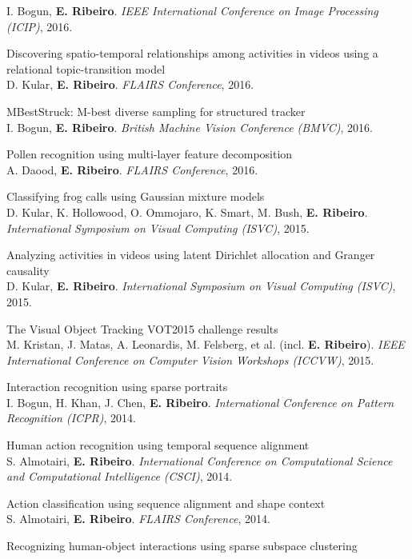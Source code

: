 \documentclass[11pt]{article}
\begin{document}
\begin{cvitems}
  I. Bogun, \textbf{E. Ribeiro}. \textit{IEEE International Conference on Image Processing (ICIP)}, 2016.
  \item Discovering spatio-temporal relationships among activities in videos using a relational topic-transition model\\
  D. Kular, \textbf{E. Ribeiro}. \textit{FLAIRS Conference}, 2016.
  \item MBestStruck: M-best diverse sampling for structured tracker\\
  I. Bogun, \textbf{E. Ribeiro}. \textit{British Machine Vision Conference (BMVC)}, 2016.
  \item Pollen recognition using multi-layer feature decomposition\\
  A. Daood, \textbf{E. Ribeiro}. \textit{FLAIRS Conference}, 2016.
  \item Classifying frog calls using Gaussian mixture models\\
  D. Kular, K. Hollowood, O. Ommojaro, K. Smart, M. Bush, \textbf{E. Ribeiro}. \textit{International Symposium on Visual Computing (ISVC)}, 2015.
  \item Analyzing activities in videos using latent Dirichlet allocation and Granger causality\\
  D. Kular, \textbf{E. Ribeiro}. \textit{International Symposium on Visual Computing (ISVC)}, 2015.
  \item The Visual Object Tracking VOT2015 challenge results\\
  M. Kristan, J. Matas, A. Leonardis, M. Felsberg, et al. (incl. \textbf{E. Ribeiro}). \textit{IEEE International Conference on Computer Vision Workshops (ICCVW)}, 2015.
  \item Interaction recognition using sparse portraits\\
  I. Bogun, H. Khan, J. Chen, \textbf{E. Ribeiro}. \textit{International Conference on Pattern Recognition (ICPR)}, 2014.
  \item Human action recognition using temporal sequence alignment\\
  S. Almotairi, \textbf{E. Ribeiro}. \textit{International Conference on Computational Science and Computational Intelligence (CSCI)}, 2014.
  \item Action classification using sequence alignment and shape context\\
  S. Almotairi, \textbf{E. Ribeiro}. \textit{FLAIRS Conference}, 2014.
  \item Recognizing human-object interactions using sparse subspace clustering\\

\end{cvitems}
\end{document}
